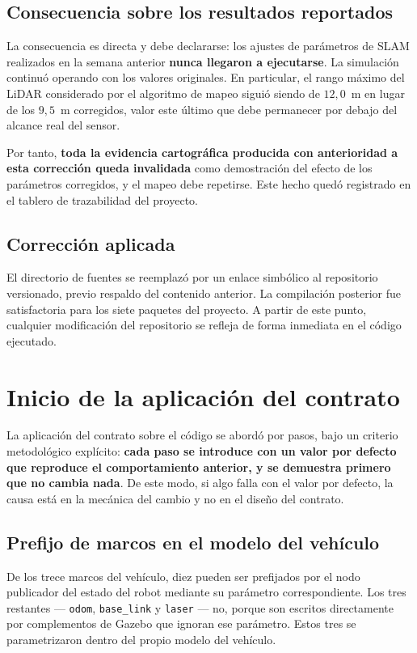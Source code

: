 \documentclass[12pt,letterpaper]{article}
\begin{document}
\subsection{Consecuencia sobre los resultados reportados}

La consecuencia es directa y debe declararse: los ajustes de parámetros de SLAM realizados en la semana anterior \textbf{nunca llegaron a ejecutarse}. La simulación continuó operando con los valores originales. En particular, el rango máximo del LiDAR considerado por el algoritmo de mapeo siguió siendo de $12{,}0$~m en lugar de los $9{,}5$~m corregidos, valor este último que debe permanecer por debajo del alcance real del sensor.

Por tanto, \textbf{toda la evidencia cartográfica producida con anterioridad a esta corrección queda invalidada} como demostración del efecto de los parámetros corregidos, y el mapeo debe repetirse. Este hecho quedó registrado en el tablero de trazabilidad del proyecto.

\subsection{Corrección aplicada}

El directorio de fuentes se reemplazó por un enlace simbólico al repositorio versionado, previo respaldo del contenido anterior. La compilación posterior fue satisfactoria para los siete paquetes del proyecto. A partir de este punto, cualquier modificación del repositorio se refleja de forma inmediata en el código ejecutado.

\section{Inicio de la aplicación del contrato}

La aplicación del contrato sobre el código se abordó por pasos, bajo un criterio metodológico explícito: \textbf{cada paso se introduce con un valor por defecto que reproduce el comportamiento anterior, y se demuestra primero que no cambia nada}. De este modo, si algo falla con el valor por defecto, la causa está en la mecánica del cambio y no en el diseño del contrato.

\subsection{Prefijo de marcos en el modelo del vehículo}

De los trece marcos del vehículo, diez pueden ser prefijados por el nodo publicador del estado del robot mediante su parámetro correspondiente. Los tres restantes --- \texttt{odom}, \texttt{base\_link} y \texttt{laser} --- no, porque son escritos directamente por complementos de Gazebo que ignoran ese parámetro. Estos tres se parametrizaron dentro del propio modelo del vehículo.
\end{document}
